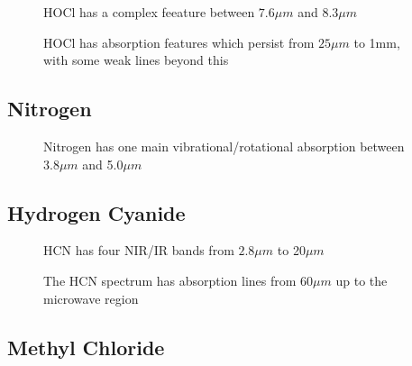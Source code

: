 \documentclass[12pt]{article}
\begin{document}
\vspace*{11.5cm}
\begin{figure}[htb]
\caption{HOCl has a complex feeature between   $7.6\mu m$
 and 8.3$\mu m$}
\end{figure}
\newpage



\vspace*{11.5cm}
\begin{figure}[htb]
\caption{HOCl has absorption features which persist from $25\mu m$
 to 1mm, with some weak lines beyond this}
\end{figure}
\newpage


\subsection{Nitrogen}

\vspace*{11.5cm}
\begin{figure}[htb]
\caption{Nitrogen has one main vibrational/rotational absorption between  $3.8\mu m$
 and 5.0$\mu m$}
\end{figure}
\newpage


\subsection{Hydrogen Cyanide}

\vspace*{11.5cm}
\begin{figure}[htb]
\caption{HCN has four NIR/IR bands from $2.8\mu m$
to  20$\mu m$}
\end{figure}
\newpage


\vspace*{11.5cm}
\begin{figure}[htb]
\caption{The HCN spectrum has absorption lines from $60\mu m$
up to the microwave region}
\end{figure}
\newpage

\subsection{Methyl Chloride}
\end{document}
